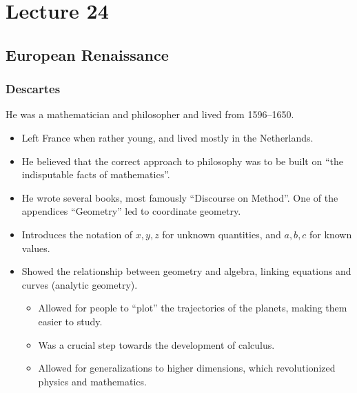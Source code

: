 \documentclass[class=article, crop=false]{standalone}
\begin{document}
  \section{Lecture 24}
  \subsection{European Renaissance}
  \subsubsection{Descartes}
  He was a mathematician and philosopher and lived from 1596--1650.
  \begin{itemize}
    \item Left France when rather young, and lived mostly in the Netherlands.
    \item He believed that the correct approach to philosophy was to be built on ``the indisputable facts of mathematics''.
    \item He wrote several books, most famously ``Discourse on Method''. One of the appendices ``Geometry'' led to coordinate geometry.
    \item Introduces the notation of $x, y, z$ for unknown quantities, and $a, b, c$ for known values.
    \item Showed the relationship between geometry and algebra, linking equations and curves (analytic geometry).
    \begin{itemize}
      \item Allowed for people to ``plot'' the trajectories of the planets, making them easier to study.
      \item Was a crucial step towards the development of calculus.
      \item Allowed for generalizations to higher dimensions, which revolutionized physics and mathematics.
    \end{itemize}
  \end{itemize}
\end{document}

